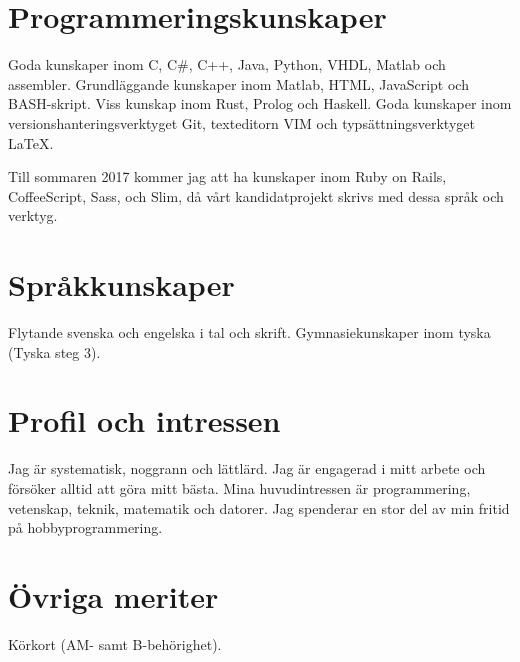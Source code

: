 \documentclass[a4paper,notitlepage]{article}
\begin{document}

\section*{Programmeringskunskaper}
Goda kunskaper inom C, C\#, C++, Java, Python, VHDL, Matlab och assembler.
Grundläggande kunskaper inom Matlab, HTML, JavaScript och BASH-skript. Viss kunskap inom 
Rust, Prolog och Haskell. Goda kunskaper inom
versionshanteringsverktyget Git, texteditorn VIM och typsättningsverktyget LaTeX.

Till sommaren 2017 kommer jag att ha kunskaper inom Ruby on Rails, CoffeeScript,
Sass, och Slim, då vårt kandidatprojekt skrivs med dessa språk och verktyg.

\section*{Språkkunskaper}
Flytande svenska och engelska i tal och skrift. Gymnasiekunskaper inom tyska
(Tyska steg 3).

\section*{Profil och intressen}
Jag är systematisk, noggrann och lättlärd. Jag är engagerad i mitt arbete och
försöker alltid att göra mitt bästa. Mina huvudintressen är programmering, vetenskap, 
teknik, matematik och datorer. Jag spenderar en stor del av min fritid på
hobbyprogrammering.

\section*{Övriga meriter}
Körkort (AM- samt B-behörighet).
\end{document}
